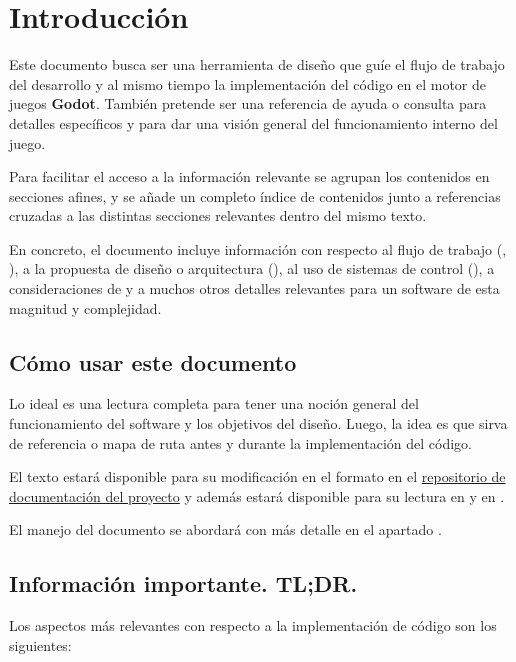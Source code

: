 
\section{Introducción}\label{intro:introduccion}

Este documento busca ser una herramienta de diseño que guíe el flujo de trabajo
del desarrollo y al mismo tiempo la implementación del código en el motor de
juegos \textbf{Godot}. También pretende ser una referencia de ayuda o consulta
para detalles específicos y para dar una visión general del funcionamiento
interno del juego.

Para facilitar el acceso a la información relevante se agrupan los contenidos
en secciones afines, y se añade un completo índice de contenidos junto a
referencias cruzadas a las distintas secciones relevantes dentro del mismo
texto.

En concreto, el documento incluye información con respecto al flujo de trabajo
(, ), a la
propuesta de diseño o arquitectura (),
al uso de sistemas de control  (), a
consideraciones de  y a muchos otros
detalles relevantes para un software de esta magnitud y complejidad.

\subsection{Cómo usar este documento}\label{intro:como-usar-el-documento}
Lo ideal es una lectura completa para tener una noción general del
funcionamiento del software y los objetivos del diseño. Luego, la idea es que
sirva de referencia o mapa de ruta antes y durante la implementación del
código.

El texto estará disponible para su modificación en el formato  en el
\href{https://github.com/polirritmico/Bakumapu-docs}{repositorio de
documentación del proyecto} y además estará disponible para su lectura en
\href{https://polirritmico.github.io/Bakumapu-docs/}{} y en
\href{https://github.com/polirritmico/Bakumapu-docs/blob/main/main.pdf}{}.

El manejo del documento se abordará con más detalle en el apartado
.

\subsection{Información importante. TL;DR.}
\noindent Los aspectos más relevantes con respecto a la implementación de
código son los siguientes:

